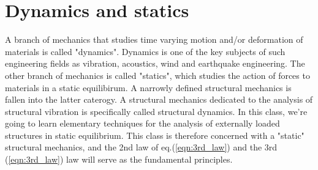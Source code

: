 \documentclass[10pt,a4j]{article}
\begin{document}
\section{Dynamics and statics}
A branch of mechanics that studies time varying motion and/or deformation of materials is 
called "dynamics". Dynamics is one of the key subjects of such engineering fields 
as vibration, acoustics, wind and earthquake engineering.
The other branch of mechanics is called "statics", which studies the action of forces 
to materials in a static equilibirum. A narrowly defined structural mechanics is fallen 
into the latter caterogy. A structural mechanics dedicated to the analysis of structural 
vibration is specifically called structural dynamics. In this class, we're going to learn 
elementary techniques for the analysis of externally loaded structures in static equilibrium.
This class is therefore concerned with a "static" structural mechanics, 
and the 2nd law of eq.(\ref{eqn:3rd_law}) and the 3rd (\ref{eqn:3rd_law}) law will 
serve as the fundamental principles. 
\end{document}
